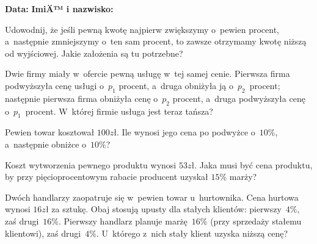 \documentclass[addpoints]{exam}
\begin{document}
\raggedleft \textbf {Data:\enspace\makebox[2in]{\hrulefill}} 
\hfill  \textbf{ImiÄ™ i nazwisko: \enspace\makebox[2in]{\hrulefill}}
	
\vspace{0.1in}

	\begin{questions}

  \question
    Udowodnij, że jeśli pewną kwotę najpierw zwiększymy o~pewien
    procent, a~następnie zmniejszymy o~ten sam procent, to zawsze
    otrzymamy kwotę niższą od wyjściowej.  Jakie założenia są tu
    potrzebne?

  \question
    Dwie firmy miały w~ofercie pewną usługę w~tej samej cenie.
    Pierwsza firma podwyższyła cenę usługi o~$p_1$ procent, a~druga
    obniżyła ją o~$p_2$~procent; następnie pierwsza firma obniżyła
    cenę o~$p_2$ procent, a~druga podwyższyła cenę o~$p_1$~procent.
    W~której firmie usługa jest teraz tańsza?

  \question
    Pewien towar kosztował $100zł$.  Ile wynosi jego cena po podwyżce
    o~$10\%$, a~następnie obniżce o~$10\%$?

  \question
    Koszt wytworzenia pewnego produktu wynosi $53zł$.  Jaka musi być
    cena produktu, by przy pięcioprocentowym rabacie producent uzyskał
    $15\%$ marży?

  \question
    Dwóch handlarzy zaopatruje się w~pewien towar u~hurtownika.  Cena
    hurtowa wynosi $16zł$ za sztukę.  Obaj stosują upusty dla stałych
    klientów: pierwszy~$4\%$, zaś drugi~$16\%$.  Pierwszy handlarz
    planuje marżę~$16\%$ (przy sprzedaży stałemu klientowi), zaś
    drugi~$4\%$.  U~którego z~nich stały klient uzyska niższą cenę?



	\end{questions}
\end{document}
